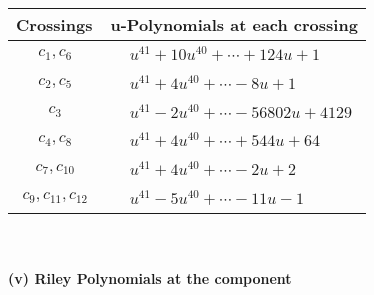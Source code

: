 \documentclass[1p]{elsarticle_modified}
\theoremstyle{definition}
\begin{document}
\begin{tabular}{m{50pt}|m{274pt}}
Crossings & \hspace{64pt}u-Polynomials at each crossing \\
\hline $$\begin{aligned}c_{1},c_{6}\end{aligned}$$&$\begin{aligned}
&u^{41}+10 u^{40}+\cdots+124 u+1
\end{aligned}$\\
\hline $$\begin{aligned}c_{2},c_{5}\end{aligned}$$&$\begin{aligned}
&u^{41}+4 u^{40}+\cdots-8 u+1
\end{aligned}$\\
\hline $$\begin{aligned}c_{3}\end{aligned}$$&$\begin{aligned}
&u^{41}-2 u^{40}+\cdots-56802 u+4129
\end{aligned}$\\
\hline $$\begin{aligned}c_{4},c_{8}\end{aligned}$$&$\begin{aligned}
&u^{41}+4 u^{40}+\cdots+544 u+64
\end{aligned}$\\
\hline $$\begin{aligned}c_{7},c_{10}\end{aligned}$$&$\begin{aligned}
&u^{41}+4 u^{40}+\cdots-2 u+2
\end{aligned}$\\
\hline $$\begin{aligned}c_{9},c_{11},c_{12}\end{aligned}$$&$\begin{aligned}
&u^{41}-5 u^{40}+\cdots-11 u-1
\end{aligned}$\\
\hline
\end{tabular}\\~\\
\newpage\renewcommand{\arraystretch}{1}
\flushleft \textbf{(v) Riley Polynomials at the component}\newline \\
\end{document}
